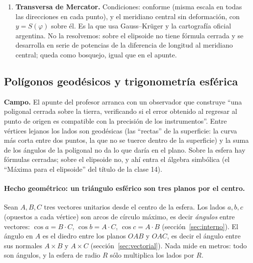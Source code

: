 \begin{enumerate}
  radio \(R_q\) con la misma área total, \(4\pi R_q^2=2\pi a^2q_A(\pi/2)\), es decir
  \(R_q=a\sqrt{q_A(\pi/2)/2}=6\,371\,007{,}181\) m (control: el área del elipsoide GRS80
  es \(510\,065\,621{,}7\) km\(^2\) por la fórmula exacta
  \(2\pi a^2+\pi\frac{b^2}e\ln\frac{1+e}{1-e}\), y \(4\pi R_q^2\) da lo mismo); y a cada
  paralelo \(\varphi\) le corresponde en la esfera la latitud \(\beta_A\) con
  \(\sin\beta_A=q_A(\varphi)/q_A(\pi/2)\) (latitud autálica): \(44{,}8717^\circ\) para
  \(45^\circ\), \(-34{,}4801^\circ\) para Buenos Aires. Lo demás (las longitudes) no cambia.
  \item \textbf{Transversa de Mercator.} Condiciones: conforme (misma escala en todas las
  direcciones en cada punto), y el meridiano central sin deformación, con \(y=S(\varphi)\)
  sobre él. Es la que usa Gauss--Krüger y la cartografía oficial argentina. No la resolvemos:
  sobre el elipsoide no tiene fórmula cerrada y se desarrolla en serie de potencias de la
  diferencia de longitud al meridiano central; queda como bosquejo, igual que en el apunte.
\end{enumerate}

\subsection{Polígonos geodésicos y trigonometría esférica}\label{sec:trigonometria-esferica}

{\small\vspace{1mm}\par}


\textbf{Campo.} El apunte del profesor arranca con un observador que construye ``una
poligonal cerrada sobre la tierra, verificando si el error obtenido al regresar al punto de
origen es compatible con la precisión de los instrumentos''. Entre vértices lejanos los
lados son geodésicas (las ``rectas'' de la superficie: la curva más corta entre dos puntos,
la que no se tuerce dentro de la superficie) y la suma de los ángulos de la poligonal no da
lo que daría en el plano. Sobre la esfera hay fórmulas cerradas; sobre el elipsoide no, y
ahí entra el álgebra simbólica (el ``Máxima para el elipsoide'' del título de la clase 14).

\paragraph{Hecho geométrico: un triángulo esférico son tres planos por el centro.} Sean
\(A,B,C\) tres vectores unitarios desde el centro de la esfera. Los lados \(a,b,c\)
(opuestos a cada vértice) son arcos de círculo máximo, es decir \emph{ángulos} entre
vectores: \(\cos a=B\cdot C\), \(\cos b=A\cdot C\), \(\cos c=A\cdot B\)
(sección~\ref{sec:interno}). El ángulo en \(A\) es el diedro entre los planos \(OAB\) y
\(OAC\), es decir el ángulo entre sus normales \(A\times B\) y \(A\times C\)
(sección~\ref{sec:vectorial}). Nada mide en metros: todo son ángulos, y la esfera de radio
\(R\) sólo multiplica los lados por \(R\).

